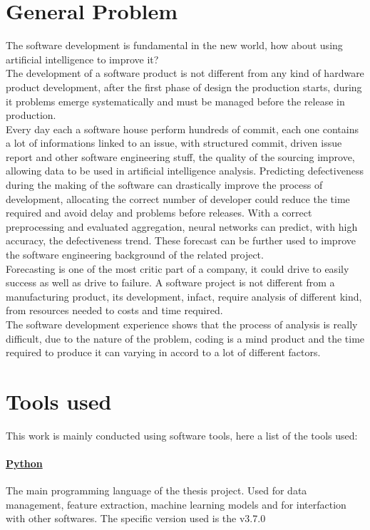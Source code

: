 \documentclass[%
    corpo=12pt,
    twoside,
    oldstyle,
    autoretitolo,
    greek,
    evenboxes,
]{toptesi}
\begin{document}
\section{General Problem}
The software development is fundamental in the new world, how about using artificial intelligence to improve it?\\
The development of a software product is not different from any kind of hardware product development, after the first phase of design the production starts, during it problems emerge systematically and must be managed before the release in production.\\
Every day each a software house perform hundreds of commit, each one contains a lot of informations linked to an issue, with structured commit, driven issue report and other software engineering stuff, the quality of the sourcing improve, allowing data to be used in artificial intelligence analysis. Predicting defectiveness during the making of the software can drastically improve the process of development, allocating the correct number of developer could reduce the time required and avoid delay and problems before releases.
With a correct preprocessing and evaluated aggregation, neural networks can predict, with high accuracy, the defectiveness trend. These forecast can be further used to improve the software engineering background of the related project.\\
Forecasting is one of the most critic part of a company, it could drive to easily success as well as drive to failure. A software project is not different from a manufacturing product, its development, infact, require analysis of different kind, from resources needed to costs and time required.\\
The software development experience shows that the process of analysis is really difficult, due to the nature of the problem, coding is a mind product and the time required to produce it can varying in accord to a lot of different factors.

\section{Tools used}
This work is mainly conducted using software tools, here a list of the tools used:

\paragraph{\href{https://www.python.org/}{Python}} The main programming language of the thesis project. Used for data management, feature extraction, machine learning models and for interfaction with other softwares. The specific version used is the v3.7.0
\end{document}
